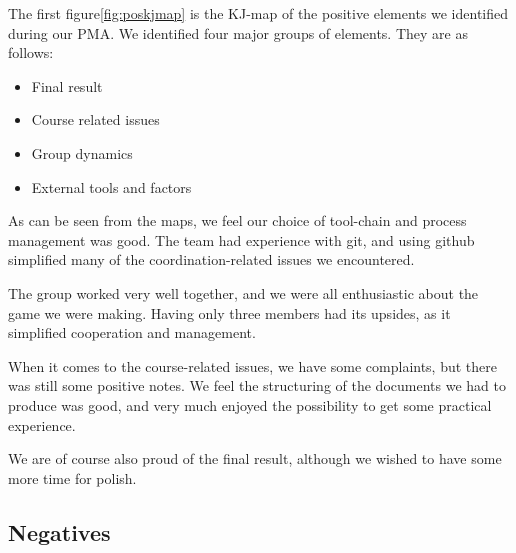 \documentclass[titlepage,a4paper,11pt]{article}
\begin{document}
The first figure\ref{fig:poskjmap} is the KJ-map of the positive elements 
we identified during our PMA. We identified four major groups of elements.
They are as follows:

\begin{itemize}
    \item Final result
    \item Course related issues
    \item Group dynamics
    \item External tools and factors
\end{itemize}

As can be seen from the maps, we feel our choice of tool-chain and
process management was good. The team had experience with git, and using
github simplified many of the coordination-related issues we encountered.

The group worked very well together, and we were all enthusiastic about
the game we were making. Having only three members had its upsides, as it
simplified cooperation and management.

When it comes to the course-related issues, we have some complaints, but
there was still some positive notes.  We feel the structuring of the
documents we had to produce was good, and very much enjoyed the possibility
to get some practical experience.

We are of course also proud of the final result, although we wished to
have some more time for polish.

\subsection{Negatives}
\end{document}
